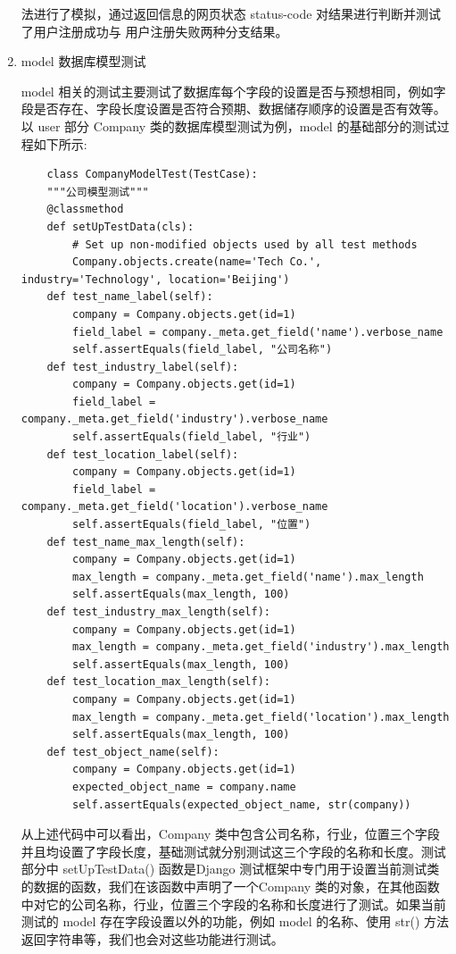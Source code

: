 \documentclass[UTF8,a4paper,10pt]{ctexart}
\begin{document}
\begin{enumerate}
法进行了模拟，通过返回信息的网页状态 status-code 对结果进行判断并测试了用户注册成功与
用户注册失败两种分支结果。
\item model 数据库模型测试
\par\hspace{2em} model 相关的测试主要测试了数据库每个字段的设置是否与预想相同，例如字段是否存在、字段长度设置是否符合预期、数据储存顺序的设置是否有效等。以 user 部分 Company 类的数据库模型测试为例，model 的基础部分的测试过程如下所示:
\begin{lstlisting}
    class CompanyModelTest(TestCase):
    """公司模型测试"""
    @classmethod
    def setUpTestData(cls):
        # Set up non-modified objects used by all test methods
        Company.objects.create(name='Tech Co.', industry='Technology', location='Beijing')
    def test_name_label(self):
        company = Company.objects.get(id=1)
        field_label = company._meta.get_field('name').verbose_name
        self.assertEquals(field_label, "公司名称")
    def test_industry_label(self):
        company = Company.objects.get(id=1)
        field_label = company._meta.get_field('industry').verbose_name
        self.assertEquals(field_label, "行业")
    def test_location_label(self):
        company = Company.objects.get(id=1)
        field_label = company._meta.get_field('location').verbose_name
        self.assertEquals(field_label, "位置")
    def test_name_max_length(self):
        company = Company.objects.get(id=1)
        max_length = company._meta.get_field('name').max_length
        self.assertEquals(max_length, 100)
    def test_industry_max_length(self):
        company = Company.objects.get(id=1)
        max_length = company._meta.get_field('industry').max_length
        self.assertEquals(max_length, 100)
    def test_location_max_length(self):
        company = Company.objects.get(id=1)
        max_length = company._meta.get_field('location').max_length
        self.assertEquals(max_length, 100)
    def test_object_name(self):
        company = Company.objects.get(id=1)
        expected_object_name = company.name
        self.assertEquals(expected_object_name, str(company))
\end{lstlisting}
\par\hspace{2em} 从上述代码中可以看出，Company 类中包含公司名称，行业，位置三个字段并且均设置了字段长度，基础测试就分别测试这三个字段的名称和长度。测试部分中 setUpTestData() 函数是Django 测试框架中专门用于设置当前测试类的数据的函数，我们在该函数中声明了一个Company 类的对象，在其他函数中对它的公司名称，行业，位置三个字段的名称和长度进行了测试。如果当前测试的 model 存在字段设置以外的功能，例如 model 的名称、使用 str() 方法返回字符串等，我们也会对这些功能进行测试。

\end{enumerate}
\end{document}

